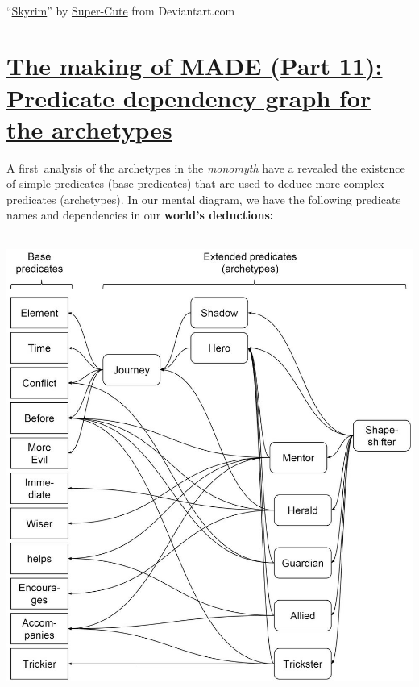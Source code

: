 \documentclass[a4paper]{article}
\newcommand\textstyleStrongEmphasis[1]{\textbf{#1}}
\newcommand\textstyleEmphasis[1]{\textit{#1}}
\begin{document}
~



{\textquotedblleft}\href{http://www.deviantart.com/art/Skyrim-268746720}{Skyrim}{\textquotedblright}
by \href{http://super-cute.deviantart.com/}{Super-Cute} from
Deviantart.com

\bigskip

\clearpage\section[The making of MADE (Part 11): Predicate dependency
graph for the
archetypes]{\href{http://www.velonuboso.com/made/2015/07/18/making-part-11-predicate-dependency-graph-archetypes/}{The
making of MADE (Part 11): Predicate dependency graph for the
archetypes}}
A first~analysis of the archetypes in the \textstyleEmphasis{monomyth}
have a revealed the existence of simple predicates (base predicates)
that are used to deduce more complex predicates (archetypes). In our
mental diagram, we have the following predicate names and dependencies
in our \textstyleStrongEmphasis{world{\textquoteright}s deductions:}

\href{http://www.velonuboso.com/made/blog/wp-content/uploads/2015/07/descarga.jpg}{
\includegraphics[width=14.229cm,height=15.109cm]{makingofmade113-img16.jpg}
}
\end{document}

